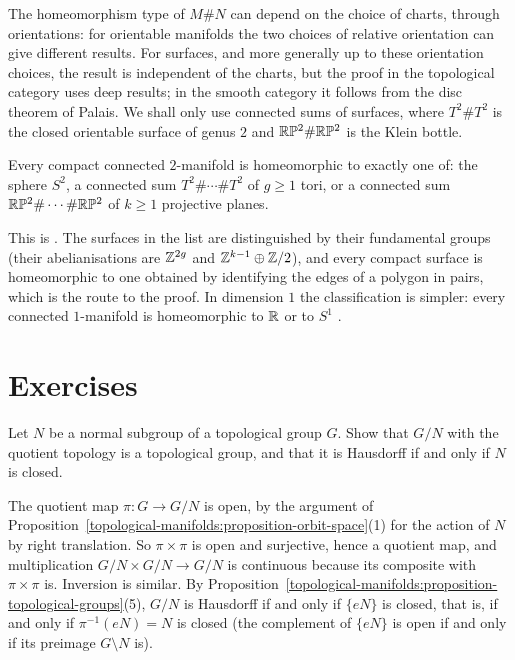 \begin{remark}\label{topological-manifolds:remark-connected-sum}
The homeomorphism type of $M \# N$ can depend on the choice of charts, through orientations: for orientable manifolds the two choices of relative orientation can give different results. For surfaces, and more
generally up to these orientation choices, the result is independent of the charts, but the proof in the topological category uses deep results; in the smooth category it follows from the disc theorem of Palais.
We shall only use connected sums of surfaces, where $T^2 \# T^2$ is the closed orientable surface of genus $2$ and $\mathbb{R}\mathbb{P}^2 \# \mathbb{R}\mathbb{P}^2$ is the Klein bottle.
\end{remark}

\begin{theorem}\label{topological-manifolds:theorem-classification-surfaces}
Every compact connected $2$-manifold is homeomorphic to exactly one of: the sphere $S^2$, a connected sum $T^2 \# \cdots \# T^2$ of $g \geq 1$ tori, or a connected sum $\mathbb{R}\mathbb{P}^2 \# \cdots \# \mathbb{R}\mathbb{P}^2$ of $k \geq 1$ projective planes.
\end{theorem}

This is \cite[Chapter 12]{munkres-topology}. The surfaces in the list are distinguished by their fundamental groups (their abelianisations are $\mathbb{Z}^{2g}$ and $\mathbb{Z}^{k-1} \oplus \mathbb{Z}/2$), and every compact surface is homeomorphic to one
obtained by identifying the edges of a polygon in pairs, which is the route to the proof. In dimension $1$ the classification is simpler: every connected $1$-manifold is homeomorphic to $\mathbb{R}$ or to $S^1$
\cite[Appendix]{milnor-differential-viewpoint}.

\section{Exercises}\label{topological-manifolds:section-exercises}

\begin{exercise}\label{topological-manifolds:exercise-quotient-group}
Let $N$ be a normal subgroup of a topological group $G$. Show that $G/N$ with the quotient topology is a topological group, and that it is Hausdorff if and only if $N$ is closed.
\end{exercise}

\begin{solution}
The quotient map $\pi \colon G \to G/N$ is open, by the argument of Proposition~\ref{topological-manifolds:proposition-orbit-space}(1) for the action of $N$ by right translation. So $\pi \times \pi$ is open and surjective, hence a
quotient map, and multiplication $G/N \times G/N \to G/N$ is continuous because its composite with $\pi \times \pi$ is. Inversion is similar. By Proposition~\ref{topological-manifolds:proposition-topological-groups}(5), $G/N$ is
Hausdorff if and only if $\{eN\}$ is closed, that is, if and only if $\pi^{-1}(eN) = N$ is closed (the complement of $\{eN\}$ is open if and only if its preimage $G \setminus N$ is).
\end{solution}

